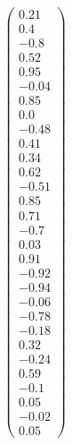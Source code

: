 \documentclass[preview]{standalone}
\begin{document}
\begin{align*}
\begin{pmatrix} 0.21 \\ 0.4 \\ -0.8 \\ 0.52 \\ 0.95 \\ -0.04 \\ 0.85 \\ 0.0 \\ -0.48 \\ 0.41 \\ 0.34 \\ 0.62 \\ -0.51 \\ 0.85 \\ 0.71 \\ -0.7 \\ 0.03 \\ 0.91 \\ -0.92 \\ -0.94 \\ -0.06 \\ -0.78 \\ -0.18 \\ 0.32 \\ -0.24 \\ 0.59 \\ -0.1 \\ 0.05 \\ -0.02 \\ 0.05 \end{pmatrix}
\end{align*}
\end{document}
